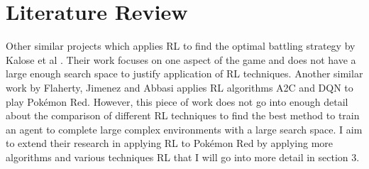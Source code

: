 \section{Literature Review}

Other similar projects which applies RL to find the optimal battling strategy by Kalose et al \cite{kalose2018optimal}. 
Their work focuses on one aspect of the game and does not have a large enough search space to justify application of RL techniques. 
Another similar work by Flaherty, Jimenez and Abbasi \cite{flaherty2021playing} applies RL algorithms A2C and DQN to play Pokémon 
Red. However, this piece of work does not go into enough detail about the comparison of different RL techniques to find the best
 method to train an agent to complete large complex environments with a large search space. I aim to extend their research in 
 applying RL to Pokémon Red by applying more algorithms and various techniques RL that I will go into more detail in section 3.
\par
